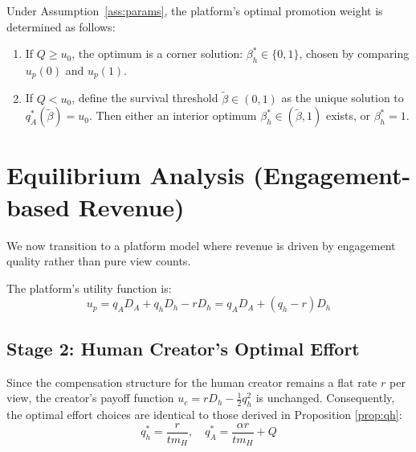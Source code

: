 \documentclass[mnsc,nonblindrev]{informs3_NoOR}
\begin{document}
\begin{proposition}\label{prop:combined}
Under Assumption~\ref{ass:params}, the platform's optimal promotion weight is determined as follows:
\begin{enumerate}
\item[\textup{(i)}] If $Q \ge u_0$, the optimum is a corner solution: $\beta_h^* \in \{0,1\}$, chosen by comparing $u_p(0)$ and $u_p(1)$.
\item[\textup{(ii)}] If $Q < u_0$, define the survival threshold $\tilde\beta \in (0,1)$ as the unique solution to $q_A^*(\tilde\beta) = u_0$. Then either an interior optimum $\beta_h^* \in (\tilde\beta, 1)$ exists, or $\beta_h^* = 1$.
\end{enumerate}
\end{proposition}



\section{Equilibrium Analysis (Engagement-based Revenue)}
\label{sec:analysis}
We now transition to a platform model where revenue is driven by engagement quality rather than pure view counts.

The platform's utility function is:
\begin{equation}
u_{p} = q_{A}D_{A} + q_{h}D_{h} - r D_{h} = q_{A}D_{A} + (q_{h} - r)D_{h}
\end{equation}

\subsection{Stage 2: Human Creator's Optimal Effort}

Since the compensation structure for the human creator remains a flat rate $r$ per view, the creator's payoff function $u_{c} = r D_{h} - \frac{1}{2}q_{h}^{2}$ is unchanged. Consequently, the optimal effort choices are identical to those derived in Proposition \ref{prop:qh}:
\begin{equation}
q_{h}^{*} = \frac{r}{tm_{H}}, \quad q_{A}^{*} = \frac{\alpha r}{tm_{H}} + Q
\end{equation}
\end{document}
